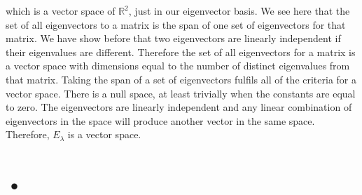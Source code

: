 \documentclass[12pt]{article}
\begin{document}
which is a vector space of $\mathbb{R}^2$, just in our eigenvector basis. We see here that the set of all eigenvectors to a matrix is the span of one set of eigenvectors for that matrix. We have show before that two eigenvectors are linearly independent if their eigenvalues are different. Therefore the set of all eigenvectors for a matrix is a vector space with dimensions equal to the number of distinct eigenvalues from that matrix. Taking the span of a set of eigenvectors fulfils all of the criteria for a vector space. There is a null space, at least trivially when the constants are equal to zero. The eigenvectors are linearly independent and any linear combination of eigenvectors in the space will produce another vector in the same space. Therefore, $E_{\lambda}$ is a vector space.

\section{•}
\end{document}
